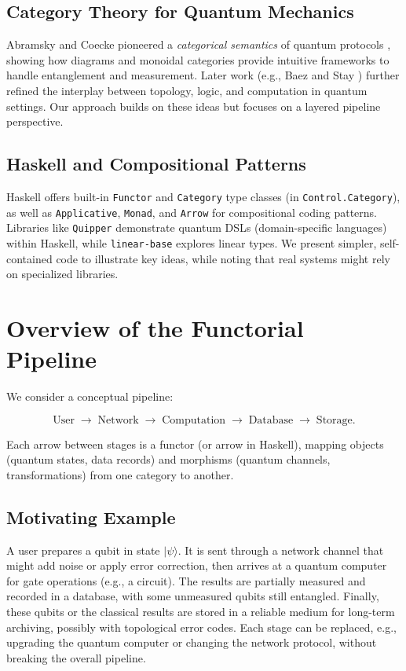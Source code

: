 \documentclass[12pt]{article}
\begin{document}
\subsection{Category Theory for Quantum Mechanics}
Abramsky and Coecke pioneered a \emph{categorical semantics} of
quantum protocols \cite{abramskyCoecke}, showing how diagrams
and monoidal categories provide intuitive frameworks to handle
entanglement and measurement. Later work (e.g., Baez and Stay
\cite{baezStay}) further refined the interplay between topology,
logic, and computation in quantum settings. Our approach builds
on these ideas but focuses on a layered pipeline perspective.

\subsection{Haskell and Compositional Patterns}
Haskell offers built-in \texttt{Functor} and \texttt{Category}
type classes (in \texttt{Control.Category}), as well as
\texttt{Applicative}, \texttt{Monad}, and \texttt{Arrow} for
compositional coding patterns. Libraries like \texttt{Quipper}
\cite{quipper} demonstrate quantum DSLs (domain-specific languages)
within Haskell, while \texttt{linear-base} explores linear types.
We present simpler, self-contained code to illustrate key ideas,
while noting that real systems might rely on specialized libraries.

\section{Overview of the Functorial Pipeline}

We consider a conceptual pipeline:

\[
\text{User}
\;\longrightarrow\;
\text{Network}
\;\longrightarrow\;
\text{Computation}
\;\longrightarrow\;
\text{Database}
\;\longrightarrow\;
\text{Storage}.
\]

Each arrow between stages is a functor (or arrow in Haskell),
mapping objects (quantum states, data records) and morphisms
(quantum channels, transformations) from one category to another.

\subsection{Motivating Example}
A user prepares a qubit in state \(\vert \psi \rangle\). It is
sent through a network channel that might add noise or apply error
correction, then arrives at a quantum computer for gate operations
(e.g., a circuit). The results are partially measured and recorded
in a database, with some unmeasured qubits still entangled. Finally,
these qubits or the classical results are stored in a reliable
medium for long-term archiving, possibly with topological error
codes. Each stage can be replaced, e.g., upgrading the quantum
computer or changing the network protocol, without breaking the
overall pipeline.
\end{document}
